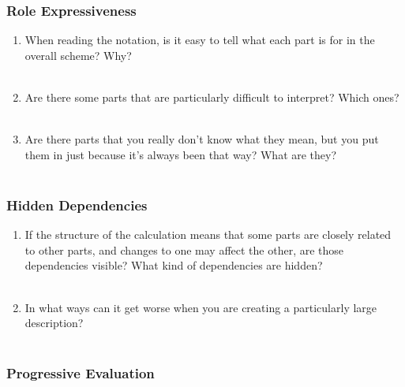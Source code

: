 \documentclass[14pt]{article}
\newcommand{\answerbox}{
\fbox{
\begin{minipage}{16cm}
\hfill\vspace{2cm}
\end{minipage}
}\\
}
\begin{document}
\subsubsection{Role Expressiveness}

\begin{enumerate}
\item When reading the notation, is it easy to tell what each part is for in the overall scheme? Why?\\
\answerbox

\pagebreak

\item Are there some parts that are particularly difficult to interpret? Which ones?\\
\answerbox
\item Are there parts that you really don’t know what they mean, but you put them in just because it’s always been that way? What are they?\\
\answerbox
\end{enumerate}

\subsubsection{Hidden Dependencies}

\begin{enumerate}
\item If the structure of the calculation means that some parts are closely related to other parts, and changes to one may affect the other, are those dependencies visible? What kind of dependencies are hidden?\\
\answerbox
\item In what ways can it get worse when you are creating a particularly large description?\\
\answerbox

\end{enumerate}

\subsubsection{Progressive Evaluation}
\end{document}
